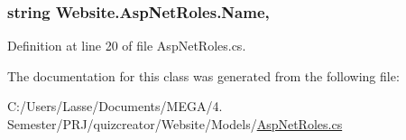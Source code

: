 \subsubsection[{Name}]{\setlength{\rightskip}{0pt plus 5cm}string Website.\+Asp\+Net\+Roles.\+Name\hspace{0.3cm}{\ttfamily [get]}, {\ttfamily [set]}}\label{class_website_1_1_asp_net_roles_a8105ae80104e38efa31b5c5dfae4c672}


Definition at line 20 of file Asp\+Net\+Roles.\+cs.



The documentation for this class was generated from the following file\+:\begin{DoxyCompactItemize}
\item 
C\+:/\+Users/\+Lasse/\+Documents/\+M\+E\+G\+A/4. Semester/\+P\+R\+J/quizcreator/\+Website/\+Models/\hyperlink{_asp_net_roles_8cs}{Asp\+Net\+Roles.\+cs}\end{DoxyCompactItemize}

